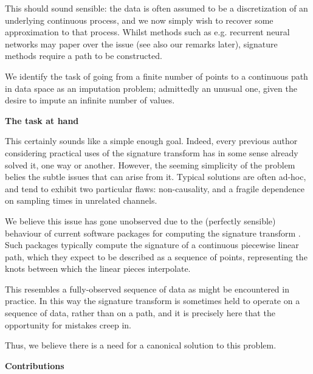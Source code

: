 \documentclass{article}
\renewcommand{\subsubsection}[1]{\textbf{#1}

} %
\begin{document}
This should sound sensible: the data is often assumed to be a discretization of an underlying continuous process, and we now simply wish to recover some approximation to that process. Whilst methods such as e.g. recurrent neural networks may paper over the issue (see also our remarks later), signature methods require a path to be constructed.

We identify the task of going from a finite number of points to a continuous path in data space as an imputation problem; admittedly an unusual one, given the desire to impute an infinite number of values.

\subsubsection{The task at hand}

This certainly sounds like a simple enough goal. Indeed, every previous author considering practical uses of the signature transform has in some sense already solved it, one way or another. However, the seeming simplicity of the problem belies the subtle issues that can arise from it. Typical solutions are often ad-hoc, and tend to exhibit two particular flaws: non-causality, and a fragile dependence on sampling times in unrelated channels.

We believe this issue has gone unobserved due to the (perfectly sensible) behaviour of current software packages for computing the signature transform \citep{esig, iisignature, signatory}. Such packages typically compute the signature of a continuous piecewise linear path, which they expect to be described as a sequence of points, representing the knots between which the linear pieces interpolate.

This resembles a fully-observed sequence of data as might be encountered in practice. In this way the signature transform is sometimes held to operate on a sequence of data, rather than on a path, and it is precisely here that the opportunity for mistakes creep in.%

Thus, we believe there is a need for a canonical solution to this problem.

\subsubsection{Contributions}
\end{document}
